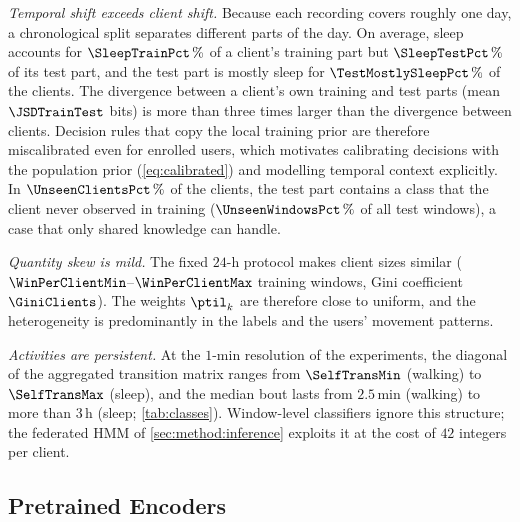 \emph{Temporal shift exceeds client shift.} Because each recording covers roughly one day, a
chronological split separates different parts of the day. On average, sleep accounts for
$\SleepTrainPct\,\%$ of a client's training part but $\SleepTestPct\,\%$ of its test part, and the
test part is mostly sleep for $\TestMostlySleepPct\,\%$ of the clients. The divergence between a
client's own training and test parts (mean $\JSDTrainTest$ bits) is more than three times larger
than the divergence between clients. Decision
rules that copy the local training prior are therefore miscalibrated even for enrolled users,
which motivates calibrating decisions with the population prior (\cref{eq:calibrated}) and modelling
temporal context explicitly. In $\UnseenClientsPct\,\%$ of the clients, the test part contains a
class that the client never observed in training ($\UnseenWindowsPct\,\%$ of all test windows), a case
that only shared knowledge can handle.

\emph{Quantity skew is mild.} The fixed $24$-h protocol makes client sizes similar
($\WinPerClientMin$--$\WinPerClientMax$ training windows, Gini coefficient $\GiniClients$). The
weights $\ptil_k$ are therefore close to uniform, and the heterogeneity is predominantly in the labels and
the users' movement patterns.

\emph{Activities are persistent.} At the $1$-min resolution of the experiments, the diagonal of the
aggregated transition matrix ranges from $\SelfTransMin$ (walking) to $\SelfTransMax$ (sleep), and
the median bout lasts from $2.5$\,min (walking) to more than $3$\,h (sleep; \cref{tab:classes}).
Window-level classifiers ignore this structure; the federated HMM of \cref{sec:method:inference}
exploits it at the cost of $42$ integers per client.

\subsection{Pretrained Encoders}\label{sec:data:encoders}

